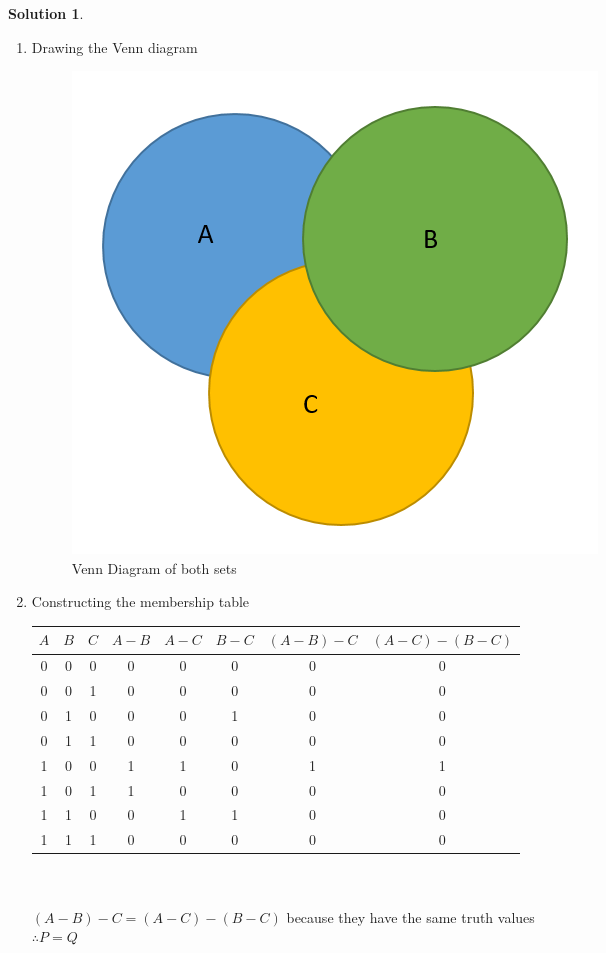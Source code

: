 \documentclass{article}
\theoremstyle{definition}
\newtheorem*{solution}{Solution}
\begin{document}
\begin{solution}\
  \begin{enumerate}
    \item Drawing the Venn diagram
      \begin{figure}[h]
        \centering
        \includegraphics[scale=0.4]{VennDiagP01.png}
        \caption{Venn Diagram of both sets }
      \end{figure}

    \item Constructing the membership table
      \begin{center}
       \begin{tabular}{||c|c|c||c|c|c|c|c|}
         \hline
         $A$ & $B$ & $C$ & $A-B$ & $A-C$ & $B-C$ & $(A-B)-C$ & $(A-C)-(B-C)$\\ [0.5ex]
         \hline\hline
         0 & 0 & 0 & 0 & 0 & 0 & 0 & 0 \\
         \hline
         0 & 0 & 1 & 0 & 0 & 0 & 0 & 0 \\
         \hline
         0 & 1 & 0 & 0 & 0 & 1 & 0 & 0 \\
         \hline
         0 & 1 & 1 & 0 & 0 & 0 & 0 & 0 \\
         \hline
         1 & 0 & 0 & 1 & 1 & 0 & 1 & 1 \\
         \hline
         1 & 0 & 1 & 1 & 0 & 0 & 0 & 0 \\
         \hline
         1 & 1 & 0 & 0 & 1 & 1 & 0 & 0 \\
         \hline
         1 & 1 & 1 & 0 & 0 & 0 & 0 & 0 \\
         \hline
      \end{tabular} \\ \ \\
      $(A-B)-C = (A-C) - (B-C)$ because they have the same truth values \\
      $\therefore   P = Q$
    \end{center}


\end{enumerate}
\end{solution}
\end{document}
